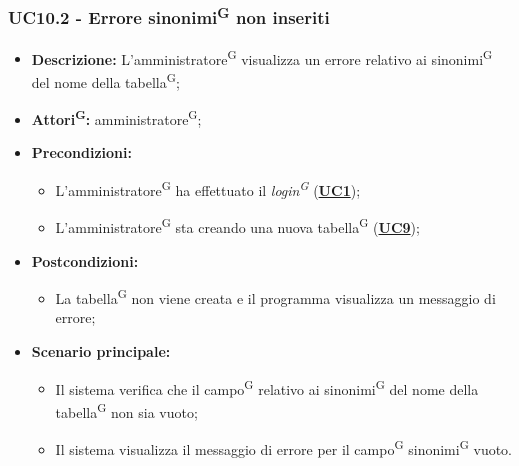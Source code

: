 \subsubsection{UC10.2 - Errore sinonimi\textsuperscript{G} non inseriti}
\label{sec:UC10.2}
\begin{itemize}
	\item \textbf{Descrizione:} L’amministratore\textsuperscript{G} visualizza un errore relativo ai sinonimi\textsuperscript{G} del nome della tabella\textsuperscript{G};
	\item \textbf{Attori\textsuperscript{G}:} amministratore\textsuperscript{G};
	\item \textbf{Precondizioni:} 
	\begin{itemize}
		\item L’amministratore\textsuperscript{G} ha effettuato il \textit{login\textsuperscript{G}} (\hyperref[sec:UC1]{\textbf{UC1}});
		\item L’amministratore\textsuperscript{G} sta creando una nuova tabella\textsuperscript{G} (\hyperref[sec:UC9]{\textbf{UC9}});
	\end{itemize}
	\item \textbf{Postcondizioni:} 
	\begin{itemize}
		\item La tabella\textsuperscript{G} non viene creata e il programma visualizza un messaggio di errore;
	\end{itemize}
	\item \textbf{Scenario principale:} 
	\begin{itemize}
		\item Il sistema verifica che il campo\textsuperscript{G} relativo ai sinonimi\textsuperscript{G} del nome della tabella\textsuperscript{G} non sia vuoto;
		\item Il sistema visualizza il messaggio di errore per il campo\textsuperscript{G} sinonimi\textsuperscript{G} vuoto.
	\end{itemize}
\end{itemize}

